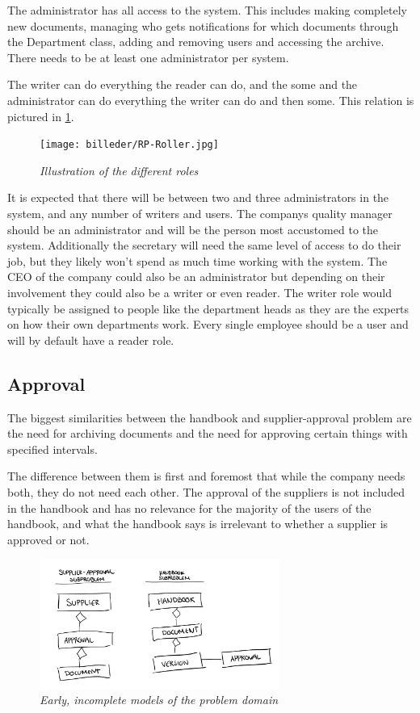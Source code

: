 The administrator has all access to the system.
This includes making completely new documents, managing who gets notifications for which documents through the Department class, adding and removing users and accessing the archive.
There needs to be at least one administrator per system.

The writer can do everything the reader can do, and the some and the administrator can do everything the writer can do and then some.
This relation is pictured in \cref{fig:RoleIllustration}.
\begin{figure}[H]
	\centering
	\texttt{[image: billeder/RP-Roller.jpg]}
	\caption{\textit{Illustration of the different roles
	}\label{fig:RoleIllustration}}
\end{figure}

It is expected that there will be between two and three administrators in the system, and any number of writers and users.
The companys quality manager should be an administrator and will be the person most accustomed to the system.
Additionally the secretary will need the same level of access to do their job, but they likely won't spend as much time working with the system.
The CEO of the company could also be an administrator but depending on their involvement they could also be a writer or even reader.
The writer role would typically be assigned to people like the department heads as they are the experts on how their own departments work.
Every single employee should be a user and will by default have a reader role.

\subsection{Approval}
The biggest similarities between the handbook and supplier-approval problem are the need for archiving documents and the need for approving certain things with specified intervals.

The difference between them is first and foremost that while the company needs both, they do not need each other.
The approval of the suppliers is not included in the handbook and has no relevance for the majority of the users of the handbook, and what the handbook says is irrelevant to whether a supplier is approved or not.

\begin{figure}[H]
	\centering
	\includegraphics[width=0.7\textwidth]{billeder/pseudoClassDiagram.jpg}
	\caption{\textit{Early, incomplete models of the problem domain
	}\label{fig:PseudoClassDiagram}}
\end{figure}

